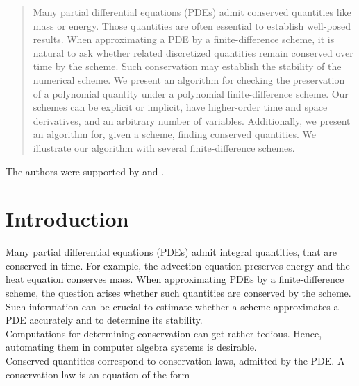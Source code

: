 \documentclass[manuscript]{acmart}
\newcommand{\1}{{\chi}}
\numberwithin{equation}{section}
\theoremstyle{thmlemcorr}
\numberwithin{theorem}{section}
\theoremstyle{thmlemcorr*}
\theoremstyle{defi}
\theoremstyle{remexample}
\theoremstyle{ass}
\begin{document}
\date{\today}

\begin{abstract}
Many partial differential equations (PDEs) admit conserved quantities like mass or energy. Those quantities are often essential to establish well-posed results. When approximating a PDE by a finite-difference scheme, it is natural to ask whether related discretized quantities remain conserved over time by the scheme. Such conservation may establish the stability of the numerical scheme. We present an algorithm for checking the preservation of a polynomial quantity under a polynomial finite-difference scheme. Our schemes can be explicit or implicit, have higher-order time and space derivatives, and an arbitrary number of variables. 
Additionally, we present an algorithm for, given a scheme, finding conserved quantities. 
We illustrate our algorithm with several finite-difference schemes.
\end{abstract}

\maketitle
\tableofcontents

\begin{acks}
	The authors were supported by  and 
	.
\end{acks}

\section{Introduction}
Many partial differential equations (PDEs) admit integral quantities, that are conserved in time. 
For example, the advection equation preserves energy and the heat equation conserves mass. 
When approximating PDEs by a finite-difference scheme, the question arises whether such quantities are conserved by the scheme. 
Such information can be crucial to estimate whether a scheme approximates a PDE accurately and to determine its stability.\\
Computations for determining conservation can get rather tedious.
Hence, automating them in computer algebra systems is desirable.\\
Conserved quantities correspond to conservation laws, admitted by the PDE. A conservation law \cite{cheviakov20} is an equation of the form
\end{document}

